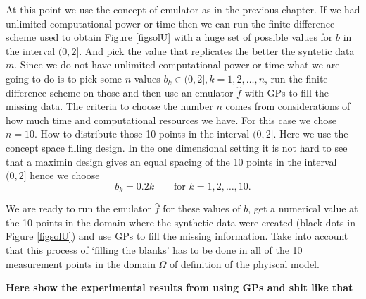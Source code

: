 \documentclass[12pt]{book}
\begin{document}
At this point  we use the concept of emulator as in the previous chapter. If we had unlimited computational
power or time then we can run the finite difference scheme used to obtain Figure \ref{figsolU} with
a huge set of possible values for $b$ in the interval $(0,2]$. And pick the value that replicates the
better the syntetic data $m$. Since we do not have unlimited computational power or time what we
are going to do is to pick some $n$  values $b_{k}\in (0,2], k=1,2,\ldots,n$, run the finite difference
scheme on those and then use an emulator $\hat{f}$ with GPs to fill the missing data. The criteria to 
choose the number $n$ comes from considerations of how much time and computational resources we have.
For this case we chose $n=10$. How to distribute those 10 points in the interval $(0,2]$. Here we
use the concept space filling design. In the one dimensional setting it is not hard to see that
a maximin design gives an equal spacing of the 10 points in the interval $(0,2]$ hence we choose
\begin{equation*}
b_{k}=0.2k \qquad\text{for }k=1,2,\ldots,10.
\end{equation*}

We are ready to run the emulator $\hat{f}$ for these values of $b$, get a numerical value at
the 10 points in the domain where the synthetic data were created (black dots in Figure \ref{figsolU})
and use GPs to fill the missing information. Take into account that this process of `filling the blanks'
has to be done in all of the 10 measurement points in the domain $\Omega$ of definition of the phyiscal model.

\textbf{Here show the experimental results from using GPs and shit like that}






\end{document}
